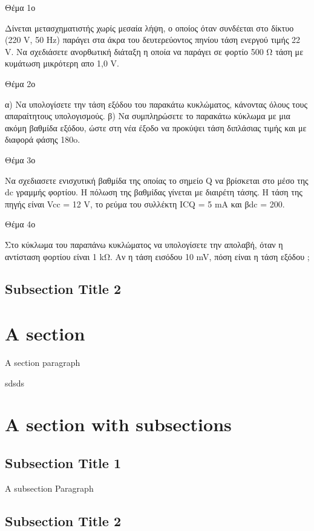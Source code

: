 \documentclass[12pt,a4paper,oneside]{book}
\begin{document}
\indent Θέμα 1ο \par
\indent Δίνεται μετασχηματιστής χωρίς μεσαία λήψη, ο οποίος όταν συνδέεται στο δίκτυο (220 V, 50 Hz) παράγει στα άκρα του δευτερεύοντος πηνίου τάση ενεργού τιμής 22 V. Να σχεδιάσετε ανορθωτική διάταξη η οποία να παράγει σε φορτίο 500 Ω τάση με κυμάτωση μικρότερη απο 1,0 V.

\indent Θέμα 2ο \par
α) Να υπολογίσετε την τάση εξόδου του παρακάτω κυκλώματος, κάνοντας όλους τους απαραίτητους υπολογισμούς.
 β) Να συμπληρώσετε το παρακάτω κύκλωμα με μια ακόμη βαθμίδα εξόδου, ώστε στη νέα έξοδο να προκύψει τάση διπλάσιας τιμής και με διαφορά φάσης 180o.

\indent Θέμα 3ο \par
Να σχεδιασετε ενισχυτική βαθμίδα της οποίας το σημείο Q να βρίσκεται στο μέσο της dc γραμμής φορτίου. Η πόλωση της βαθμίδας γίνεται με διαιρέτη τάσης. Η τάση της πηγής είναι Vcc = 12 V, το ρεύμα του συλλέκτη ΙCQ = 5 mA και βdc = 200.

\indent Θέμα 4ο \par
Στο κύκλωμα του παραπάνω κυκλώματος να υπολογίσετε την απολαβή, όταν η αντίσταση φορτίου είναι 1 kΩ. Αν η τάση εισόδου 10 mV, πόση είναι η τάση εξόδου ;

\subsection*{Subsection Title 2}

\section*{A section}
\indent A section paragraph

sdsds
\section*{A section with subsections}
\subsection*{Subsection Title 1}

\indent A subsection Paragraph


\subsection*{Subsection Title 2}
\end{document}
